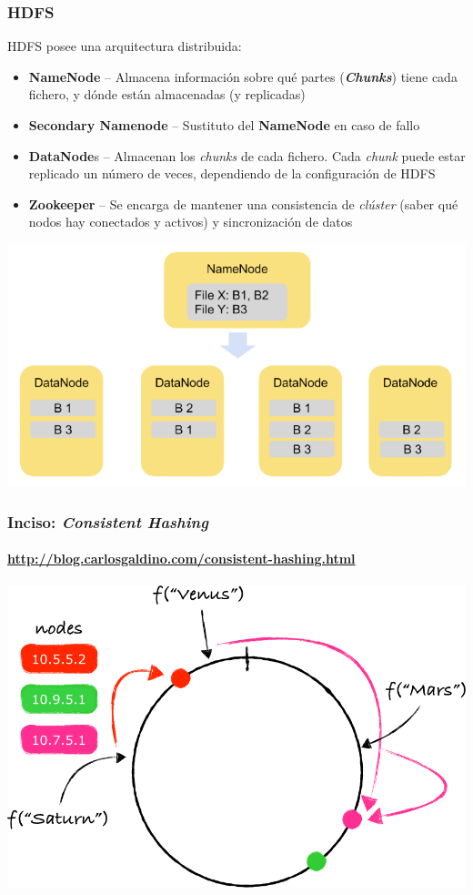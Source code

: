 \documentclass[14pt]{beamer}
\begin{document}
\begin{frame}
\begin{itemize}
\begin{frame}[allowframebreaks]
  \frametitle{HDFS}
HDFS posee una arquitectura distribuida:
    \begin{itemize}
    \item {\bf NameNode} -- Almacena información sobre qué partes
      ({\bfseries\itshape Chunks}) tiene cada fichero, y dónde están
      almacenadas (y replicadas)
    \item {\bf Secondary Namenode} -- Sustituto del {\bf NameNode} en caso
      de fallo
    \item {\bf DataNode}s -- Almacenan los {\em chunks\/} de cada fichero.
      Cada {\em chunk} puede estar replicado un número de veces,
      dependiendo de la configuración de HDFS
    \item {\bf Zookeeper} -- Se encarga de mantener una consistencia de
      {\em clúster} (saber qué nodos hay conectados y activos) y
      sincronización de datos
    \end{itemize}
  \includegraphics[width=\textwidth]{img/hdfs1}
\end{frame}

\begin{frame}
  \frametitle{Inciso: {\em Consistent Hashing}}
\framesubtitle{\url{http://blog.carlosgaldino.com/consistent-hashing.html}}
  \includegraphics[width=\textwidth]{img/consistent-hashing}
\end{frame}


\end{itemize}
\end{frame}
\end{document}
